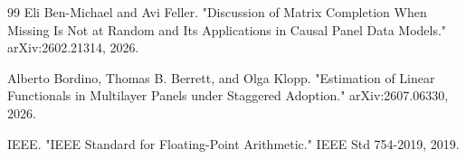 \documentclass{article}
\begin{document}
\begin{thebibliography}{99}
   Eli Ben-Michael and Avi Feller. "Discussion of Matrix Completion When Missing Is Not at Random and Its Applications in Causal Panel Data Models." arXiv:2602.21314, 2026.

   Alberto Bordino, Thomas B. Berrett, and Olga Klopp. "Estimation of Linear Functionals in Multilayer Panels under Staggered Adoption." arXiv:2607.06330, 2026.

   IEEE. "IEEE Standard for Floating-Point Arithmetic." IEEE Std 754-2019, 2019.

\end{thebibliography}
\end{document}
